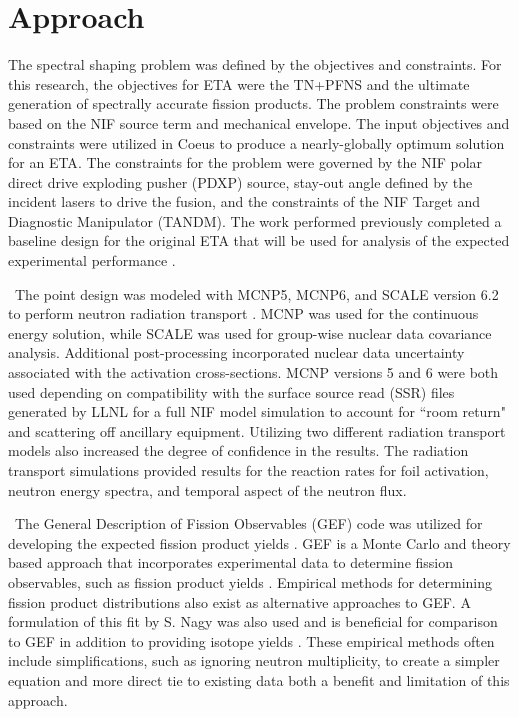 \section{Approach}

The spectral shaping problem was defined by the objectives and constraints. 
For this research, the objectives for ETA were the TN+PFNS and the ultimate generation of spectrally accurate fission products.
The problem constraints were based on the NIF source term and mechanical envelope. 
The input objectives and constraints were utilized in Coeus to produce a nearly-globally optimum solution for an ETA\cite{Bevins}. The constraints for the problem were governed by the NIF polar direct drive exploding pusher (PDXP) source, stay-out angle defined by the incident lasers to drive the fusion, and the constraints of the NIF Target and Diagnostic Manipulator (TANDM).
The work performed previously completed a baseline design for the original ETA that will be used for  analysis of the expected experimental performance \cite{Bevins}. 


\ The point design was modeled with MCNP5, MCNP6, and SCALE version 6.2 to perform neutron radiation transport \cite{MCNP5, MCNP6, SCALE}.
MCNP was used for the continuous energy solution, while SCALE was used for group-wise nuclear data covariance analysis. Additional post-processing incorporated nuclear data uncertainty associated with the activation cross-sections. 
MCNP versions 5 and 6 were both used depending on compatibility with the surface source read (SSR) files generated by LLNL for a full NIF model simulation to account for ``room return" and scattering off ancillary equipment.
Utilizing two different radiation transport models also increased the degree of confidence in the results. 
The radiation transport simulations provided results for the reaction rates for foil activation, neutron energy spectra, and temporal aspect of the neutron flux. 

\ The General Description of Fission Observables (GEF) code was utilized for developing the expected fission product yields \cite{Schmidt2015}. 
GEF is a Monte Carlo and theory based approach that incorporates experimental data to determine fission observables, such as fission product yields \cite{Schmidt2016}. 
Empirical methods for determining fission product distributions also exist as alternative approaches to GEF. 
A formulation of this fit by S. Nagy was also used and is beneficial for comparison to GEF in addition to providing isotope yields \cite{Nagy1978}. 
These empirical methods often include simplifications, such as ignoring neutron multiplicity, to create a simpler equation and more direct tie to existing data \textemdash both a benefit and limitation of this approach.  

